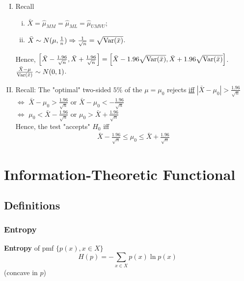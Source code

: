 \documentclass[11pt]{elegantbook}
\begin{document}
\begin{enumerate}[(I).]
    \item Recall
    \begin{enumerate}[(i).]
        \item $\bar{X}=\hat{\mu}_{MM}=\hat{\mu}_{ML}=\hat{\mu}_{UMVU}$;
        \item $\bar{X}\sim N(\mu,\frac{1}{n}) \Rightarrow \frac{1}{\sqrt{n}}=\sqrt{\textnormal{Var}(\bar{x})}$.
    \end{enumerate}
    Hence, $\left[\bar{X}-\frac{1.96}{\sqrt{n}},\bar{X}+\frac{1.96}{\sqrt{n}}\right]=\left[\bar{X}-1.96\sqrt{\textnormal{Var}(\bar{x})},\bar{X}+1.96\sqrt{\textnormal{Var}(\bar{x})}\right]$. $\frac{\bar{X}-\mu}{\textnormal{Var}(\bar{x})}\sim N(0,1)$.
    \item Recall: The "optimal" two-sided $5\%$ of the $\mu=\mu_0$ rejects \underline{iff} $|\bar{X}-\mu_0|>\frac{1.96}{\sqrt{n}}$\\
    $\Leftrightarrow$ $\bar{X}-\mu_0>\frac{1.96}{\sqrt{n}}$ or $\bar{X}-\mu_0<-\frac{1.96}{\sqrt{n}}$\\
    $\Leftrightarrow$ $\mu_0<\bar{X}-\frac{1.96}{\sqrt{n}}$ or $\mu_0>\bar{X}+\frac{1.96}{\sqrt{n}}$\\
    Hence, the test "accepts" $H_0$ iff
    \begin{equation}
        \begin{aligned}
            \bar{X}-\frac{1.96}{\sqrt{n}}\leq \mu_0\leq \bar{X}+\frac{1.96}{\sqrt{n}}
        \end{aligned}
        \nonumber
    \end{equation}
\end{enumerate}




\chapter{Information-Theoretic Functional}
\section{Definitions}
\subsection{Entropy}
\begin{definition}[Entropy]
    \textbf{Entropy} of pmf $\{p(x),x\in X\}$ $$H(p)=-\sum_{x\in X}p(x)\ln p(x)$$
    (concave in $p$)
\end{definition}
\end{document}
